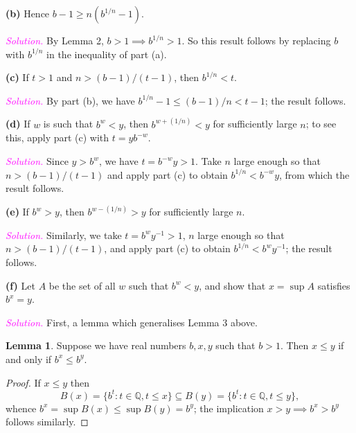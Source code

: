 \documentclass[12pt]{article}
\newcommand{\newp}{\vspace{5mm}}
\theoremstyle{definition}
\newtheorem{lemma}{Lemma}
\begin{document}
\newp

\textbf{(b)} Hence \( b - 1 \geq n(b^{1/n} - 1) \).

\newp

\textit{\textcolor{magenta}{Solution.}} By Lemma 2, \( b > 1 \implies b^{1/n} > 1 \). So this result follows by replacing \( b \) with \( b^{1/n} \) in the inequality of part (a).

\newp

\textbf{(c)} If \( t > 1 \) and \( n > (b - 1)/(t - 1) \), then \( b^{1/n} < t \).

\newp

\textit{\textcolor{magenta}{Solution.}} By part (b), we have \( b^{1/n} - 1 \leq (b - 1)/n < t - 1 \); the result follows.

\newp

\textbf{(d)} If \( w \) is such that \( b^w < y \), then \( b^{w + (1/n)} < y \) for sufficiently large \( n \); to see this, apply part (c) with \( t = y b^{-w} \).

\newp

\textit{\textcolor{magenta}{Solution.}} Since \( y > b^w \), we have \( t = b^{-w}y > 1 \). Take \( n \) large enough so that \( n > (b - 1)/(t - 1) \) and apply part (c) to obtain \( b^{1/n} < b^{-w}y \), from which the result follows.

\newp

\textbf{(e)} If \( b^w > y \), then \( b^{w - (1/n)} > y \) for sufficiently large \( n \).

\newp

\textit{\textcolor{magenta}{Solution.}} Similarly, we take \( t = b^w y^{-1} > 1 \), \( n \) large enough so that \( n > (b - 1)/(t - 1) \), and apply part (c) to obtain \( b^{1/n} < b^w y^{-1} \); the result follows.

\newp

\textbf{(f)} Let \( A \) be the set of all \( w \) such that \( b^w < y \), and show that \( x = \sup A \) satisfies \( b^x = y \).

\newp

\textit{\textcolor{magenta}{Solution.}} First, a lemma which generalises Lemma 3 above.

\begin{lemma}
Suppose we have real numbers \( b, x, y \) such that \( b > 1 \). Then \( x \leq y \) if and only if \( b^x \leq b^y \).
\end{lemma}

\begin{proof}
If \( x \leq y \) then
\[
B(x) = \{ b^t : t \in \mathbb{Q}, t \leq x \} \subseteq B(y) = \{ b^t : t \in \mathbb{Q}, t \leq y \},
\]
whence \( b^x = \sup B(x) \leq \sup B(y) = b^y \); the implication \( x > y \implies b^x > b^y \) follows similarly.
\end{proof}
\end{document}
